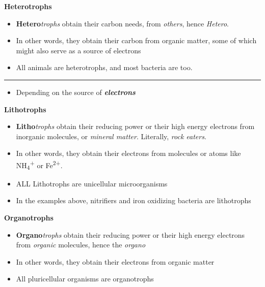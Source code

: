 \documentclass[]{book}
\providecommand{\tightlist}{%
  \setlength{\itemsep}{0pt}\setlength{\parskip}{0pt}}
\theoremstyle{definition}
\theoremstyle{definition}
\theoremstyle{definition}
\theoremstyle{remark}
\begin{document}
\textbf{Heterotrophs}

\begin{itemize}
\tightlist
\item
  \textbf{Hetero}\emph{trophs} obtain their carbon needs, from
  \emph{others}, hence \emph{Hetero}.
\item
  In other words, they obtain their carbon from organic matter, some of
  which might also serve as a source of electrons
\item
  All animals are heterotrophs, and most bacteria are too.
\end{itemize}

\begin{center}\rule{0.5\linewidth}{\linethickness}\end{center}

\begin{itemize}
\tightlist
\item
  Depending on the source of \emph{\textbf{electrons}}
\end{itemize}

\textbf{Lithotrophs}

\begin{itemize}
\tightlist
\item
  \textbf{Litho}\emph{trophs} obtain their reducing power or their high
  energy electrons from inorganic molecules, or \emph{mineral matter}.
  Literally, \emph{rock eaters}.
\item
  In other words, they obtain their electrons from molecules or atoms
  like NH\textsubscript{4}\textsuperscript{+} or Fe\textsuperscript{2+}.
\item
  ALL Lithotrophs are unicellular microorganisms
\item
  In the examples above, nitrifiers and iron oxidizing bacteria are
  lithotrophs
\end{itemize}

\textbf{Organotrophs}

\begin{itemize}
\tightlist
\item
  \textbf{Organo}\emph{trophs} obtain their reducing power or their high
  energy electrons from \emph{organic} molecules, hence the
  \emph{organo}\\
\item
  In other words, they obtain their electrons from organic matter
\item
  All pluricellular organisms are organotrophs 
\end{itemize}
\end{document}
